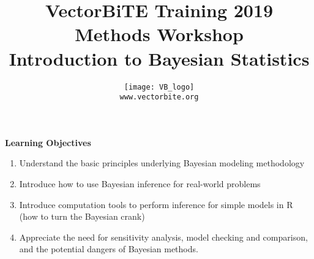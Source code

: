 \documentclass[12pt,xcolor=svgnames]{beamer}
\newcommand{\rd}{\color{red}}
\newcommand{\org}{\color{Orange}}
\newcommand{\gr}{\color{gray}}
\newcommand{\theme}{\color{FireBrick}}
\newcommand{\sk}{\vspace{.4cm}}
\newcommand{\chap}[1]{{\theme \Large \bf #1} \sk}
\begin{document}
{ \usebackgroundtemplate{}%
\thispagestyle{empty}
\setcounter{page}{0}


\title{\theme \Large \vskip 0.5cm
{\bf VectorBiTE Training 2019 \\ Methods Workshop}\\
\bigskip
\bf {\sf \gr Introduction to Bayesian Statistics}}

\author{
\begin{center}
\texttt{[image: VB\_logo]}
\end{center}
\texttt{\rd\small www.vectorbite.org}
}
\date{}
\maketitle 
}



\begin{frame}
\chap{Learning Objectives}

\begin{enumerate}
\item Understand the basic principles underlying Bayesian modeling methodology
\item  Introduce how to use Bayesian inference for real-world problems
\item Introduce computation tools to perform inference for simple models in R (how to turn the Bayesian crank)
\item Appreciate the need for sensitivity analysis, model checking and comparison, and the potential dangers of Bayesian methods.
\end{enumerate}

\end{frame}
\end{document}
